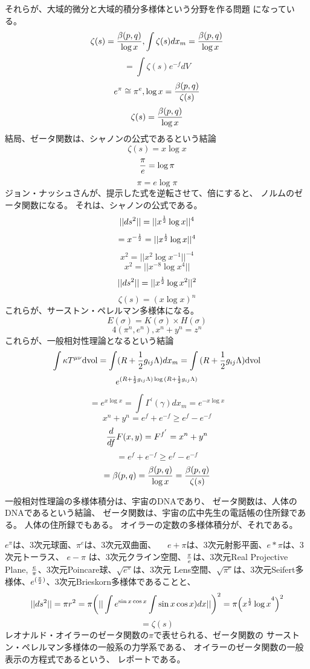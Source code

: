 \documentclass{jsarticle}
\begin{document}
	 それらが、大域的微分と大域的積分多様体という分野を作る問題
	 になっている。
	 $$ \zeta(s) = {\beta(p,q) \over {\log x}}, \int \zeta(s) dx_m =
	 {\beta(p,q) \over {\log x}} $$
	 $$ = \int \zeta(s) e^{-f}dV $$
	 $$ e^{\pi} \cong \pi^{e}, \log x = {\beta(p,q) \over {\zeta(s)}} $$
	 $$ \zeta(s) = {\beta(p,q) \over {\log x}} $$
	 結局、ゼータ関数は、シャノンの公式であるという結論
	 $$ \zeta(s) = x\log x $$
	 $$ {\pi \over {e}} = \log \pi $$
	 $$ \pi = e \log \pi $$
	 ジョン・ナッシュさんが、提示した式を逆転させて、倍にすると、
	 ノルムのゼータ関数になる。
	 それは、シャノンの公式である。
         $$ ||ds^2|| = || x^{1 \over 2}\log x||^{4}  $$
	 $$ = x^{-{1 \over 2}} = || x^{1 \over 2} \log x||^{4} $$
	 $$ x^2 = ||x^2 \log x^{-1}||^{-4} $$
	 $$ x^2 = ||x^{-8} \log x^{4}|| $$
	 $$ ||ds^2|| = ||{x^{1 \over 2}  \log x^2}||^2 $$
	 $$ \zeta(s) = (x\log x)^n $$
	 これらが、サーストン・ペレルマン多様体になる。
	 $$ E(\sigma) = K(\sigma) \times H(\sigma) $$
	 $$ 4(\pi^{n}, e^{n}), x^n + y^n = z^n $$
	 これらが、一般相対性理論となるという結論
	 $$ \int \kappa T^{\mu\nu} \mathrm{dvol} = \int (R + {1 \over 2}
	 g_{ij}\Lambda)dx_m = \int{(R + {1 \over 2}g_{ij}\Lambda)}\mathrm{
		 dvol} $$
	 $$ e^{(R+{1\over 2}g_{ij}\Lambda)\log{( R+{1\over 2}g_{ij}
	 \Lambda)}} $$
	 $$ = e^{x\log x} = \int \Gamma^{'}(\gamma)dx_m = e^{-x\log x} $$
	 $$ x^n + y^n = e^{f} + e^{-f} \ge e^{f} - e^{-f} $$
	 $$ {d \over {d f}}F(x,y) = F^{f^{'}} = x^n + y^n $$
	 $$ =  e^{f} + e^{-f} \ge e^{f} - e^{-f} $$
	 $$ = \beta(p,q) = {\beta(p,q) \over {\log x}} = {\beta(p,q) \over 
	 \zeta(s)} $$

	 一般相対性理論の多様体積分は、宇宙のDNAであり、
	 ゼータ関数は、人体のDNAであるという結論、
	 ゼータ関数は、宇宙の広中先生の電話帳の住所録である。
	 人体の住所録でもある。
	 オイラーの定数の多様体積分が、それである。



	 $e^{\pi} $は、3次元球面、$\pi^{e}$は、3次元双曲面、
	 　$e+\pi$は、3次元射影平面、$e*\pi$は、3次元トーラス、
	 $e-\pi$
	 は、3次元クライン空間、${\pi \over e}$は、3次元Real Projective Plane,
	 ${e \over {\pi}}$、3次元Poincare球、$\sqrt{{e^{\pi}}}$は、3次元
	 Lens空間、$\sqrt{\pi^{e}}$は、3次元Seifert多様体、$e^{({\pi \over 2})
	 }$、3次元Brieskorn多様体であることと、
	 $$ ||ds^2|| = \pi r^2 = \pi {\left(||\int e^{\sin x\cos x} \int \sin x \cos x)dx ||\right)^{2}} = \pi {\left({x^{1 \over 2}\log x}^{4}\right)}^{2}  $$
	 $$ = \zeta(s) $$
	 レオナルド・オイラーのゼータ関数の$\pi$で表せられる、ゼータ関数の
	 サーストン・ペレルマン多様体の一般系の力学系である、
	 オイラーのゼータ関数の一般表示の方程式であるという、
	 レポートである。
\end{document}
